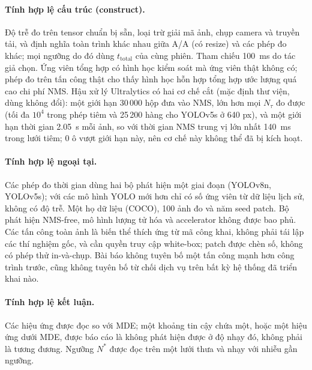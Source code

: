 \documentclass[a4paper,fleqn]{cas-dc}
\newcommand{\Ntau}{N_{\tau}}
\begin{document}
\paragraph{Tính hợp lệ cấu trúc (construct).}
Độ trễ đo trên tensor chuẩn bị sẵn, loại trừ giải mã ảnh, chụp camera và truyền tải, và định nghĩa toàn trình khác nhau giữa A/A (có resize) và các phép đo khác; mọi ngưỡng do đó dùng $t_{\mathrm{total}}$ của cùng phiên. Tham chiếu 100~ms do tác giả chọn. Ứng viên tổng hợp có hình học kiểm soát mà ứng viên thật không có; phép đo trên tấn công thật cho thấy hình học hỗn hợp tổng hợp ước lượng quá cao chi phí NMS. Hậu xử lý Ultralytics có hai cơ chế cắt (mặc định thư viện, dùng không đổi): một giới hạn 30\,000 hộp đưa vào NMS, lớn hơn mọi $\Ntau$ đo được (tối đa $10^4$ trong phép tiêm và 25\,200 hàng cho YOLOv5s ở 640 px), và một giới hạn thời gian 2.05~s mỗi ảnh, so với thời gian NMS trung vị lớn nhất 140~ms trong lưới tiêm; 0 ô vượt giới hạn này, nên cơ chế này không thể đã bị kích hoạt.
\paragraph{Tính hợp lệ ngoại tại.}
Các phép đo thời gian dùng hai bộ phát hiện một giai đoạn (YOLOv8n, YOLOv5s); với các mô hình YOLO mới hơn chỉ có số ứng viên từ dữ liệu lịch sử, không có độ trễ. Một họ dữ liệu (COCO), 100 ảnh đo và năm seed patch. Bộ phát hiện NMS-free, mô hình lượng tử hóa và accelerator không được bao phủ. Các tấn công toàn ảnh là biến thể thích ứng từ mã công khai, không phải tái lập các thí nghiệm gốc, và cần quyền truy cập white-box; patch được chèn số, không có phép thử in-và-chụp. Bài báo không tuyên bố một tấn công mạnh hơn công trình trước, cũng không tuyên bố từ chối dịch vụ trên bất kỳ hệ thống đã triển khai nào.
\paragraph{Tính hợp lệ kết luận.}
Các hiệu ứng được đọc so với MDE; một khoảng tin cậy chứa một, hoặc một hiệu ứng dưới MDE, được báo cáo là không phát hiện được ở độ nhạy đó, không phải là tương đương. Ngưỡng $N^{*}$ được đọc trên một lưới thưa và nhạy với nhiễu gần ngưỡng.
\end{document}
